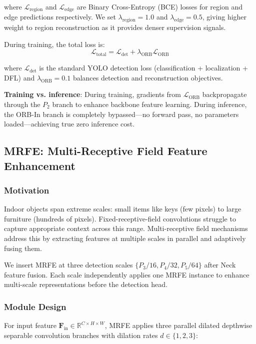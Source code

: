 \documentclass[journal]{IEEEtran}
\begin{document}
where $\mathcal{L}_{\text{region}}$ and $\mathcal{L}_{\text{edge}}$ are Binary Cross-Entropy (BCE) losses for region and edge predictions respectively. We set $\lambda_{\text{region}} = 1.0$ and $\lambda_{\text{edge}} = 0.5$, giving higher weight to region reconstruction as it provides denser supervision signals.

During training, the total loss is:
\begin{equation}
\mathcal{L}_{\text{total}} = \mathcal{L}_{\text{det}} + \lambda_{\text{ORB}} \mathcal{L}_{\text{ORB}}
\end{equation}

where $\mathcal{L}_{\text{det}}$ is the standard YOLO detection loss (classification + localization + DFL) and $\lambda_{\text{ORB}} = 0.1$ balances detection and reconstruction objectives.

\textbf{Training vs. inference}: During training, gradients from $\mathcal{L}_{\text{ORB}}$ backpropagate through the $P_2$ branch to enhance backbone feature learning. During inference, the ORB-In branch is completely bypassed—no forward pass, no parameters loaded—achieving true zero inference cost.

\subsection{MRFE: Multi-Receptive Field Feature Enhancement}

\subsubsection{Motivation}

Indoor objects span extreme scales: small items like keys (few pixels) to large furniture (hundreds of pixels). Fixed-receptive-field convolutions struggle to capture appropriate context across this range. Multi-receptive field mechanisms address this by extracting features at multiple scales in parallel and adaptively fusing them.

We insert MRFE at three detection scales $\{P_3/16, P_4/32, P_5/64\}$ after Neck feature fusion. Each scale independently applies one MRFE instance to enhance multi-scale representations before the detection head.

\subsubsection{Module Design}

For input feature $\mathbf{F}_{\text{in}} \in \mathbb{R}^{C \times H \times W}$, MRFE applies three parallel dilated depthwise separable convolution branches with dilation rates $d \in \{1, 2, 3\}$:
\end{document}
